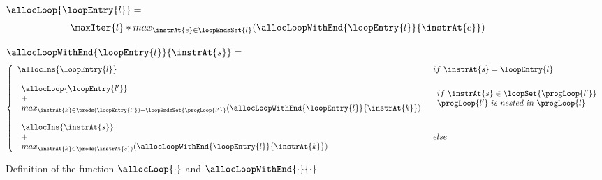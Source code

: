 \begin{figure}[!hbp]
$\allocLoop{\loopEntry{l}} = $
$$ \begin{array}{l}
    \maxIter{l} * max_{ \instrAt{e} \in \loopEndsSet{l}  } (\allocLoopWithEnd{\loopEntry{l}}{\instrAt{e}} )
   \end{array}$$



$\allocLoopWithEnd{\loopEntry{l}}{\instrAt{s}} = $
$$ 
\left\{\begin{array}{ll}

 \allocIns{\loopEntry{l}}  & if \  \instrAt{s} = \loopEntry{l} \\
  & \\
 \begin{array}{l}
           \allocLoop{\loopEntry{l'}} \\
          + \\
      max_{\instrAt{k} \in \preds(\loopEntry{l'} ) - \loopEndsSet{\progLoop{l'}}}
       ( \allocLoopWithEnd{\loopEntry{l}}{\instrAt{k}} )
    \end{array} &  \begin{array}{l}
                                        if \  \instrAt{s} \in  \loopSet{\progLoop{l'}} \\
                                          \progLoop{l'} \ is \  nested \ in \ \progLoop{l}
                                    \end{array} \\
  & \\
  \begin{array}{l}
     \allocIns{\instrAt{s}} \\
     + \\
     max_{\instrAt{k} \in \preds(\instrAt{s} )}
     ( \allocLoopWithEnd{\loopEntry{l}}{\instrAt{k}} )
                       \end{array} & else \\

\end{array} \right.
$$
 \caption{\sc Definition of the function $\allocLoop{\cdot}$ and  $\allocLoopWithEnd{\cdot}{\cdot}$ }
\label{fig:loopPath}
\end{figure}



